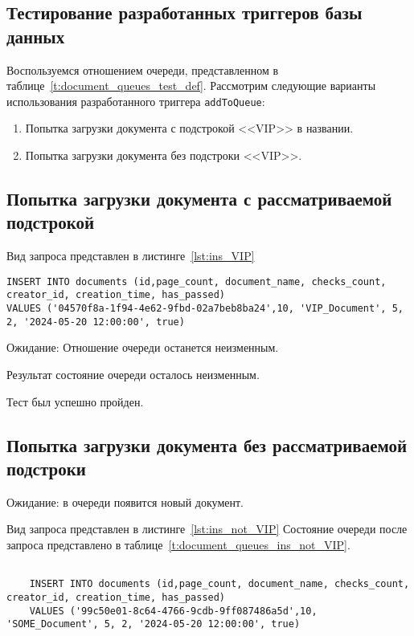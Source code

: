 \subsection{Тестирование разработанных триггеров базы данных}
Воспользуемся отношением очереди, представленном в таблице~\ref{t:document_queues_test_def}.
Рассмотрим следующие варианты использования разработанного триггера \texttt{addToQueue}:
\begin{enumerate}
	\item Попытка загрузки документа с подстрокой <<VIP>> в названии.
	\item Попытка загрузки документа  без подстроки <<VIP>>.
\end{enumerate}

\subsection{Попытка загрузки документа с рассматриваемой подстрокой}

Вид запроса представлен в листинге~\ref{lst:ins_VIP}
\begin{lstlisting}[caption=Запрос загрузки документа с подстрокой <<VIP>>,frame=tlrb,label=lst:ins_VIP]
INSERT INTO documents (id,page_count, document_name, checks_count, creator_id, creation_time, has_passed)
VALUES ('04570f8a-1f94-4e62-9fbd-02a7beb8ba24',10, 'VIP_Document', 5, 2, '2024-05-20 12:00:00', true)
\end{lstlisting}

Ожидание: Отношение очереди останется неизменным.

Результат состояние очереди осталось неизменным.

Тест был успешно пройден.
\subsection{Попытка загрузки документа без рассматриваемой подстроки}
Ожидание: в очереди появится новый документ.

Вид запроса представлен в листинге~\ref{lst:ins_not_VIP}
Состояние очереди после запроса представлено в таблице~\ref{t:document_queues_ins_not_VIP}.

\begin{lstlisting}[caption=Запрос загрузки документа без подстоки <<VIP>>,frame=tlrb,label=lst:ins_not_VIP]
	
	INSERT INTO documents (id,page_count, document_name, checks_count, creator_id, creation_time, has_passed)
	VALUES ('99c50e01-8c64-4766-9cdb-9ff087486a5d',10, 'SOME_Document', 5, 2, '2024-05-20 12:00:00', true)
\end{lstlisting}

